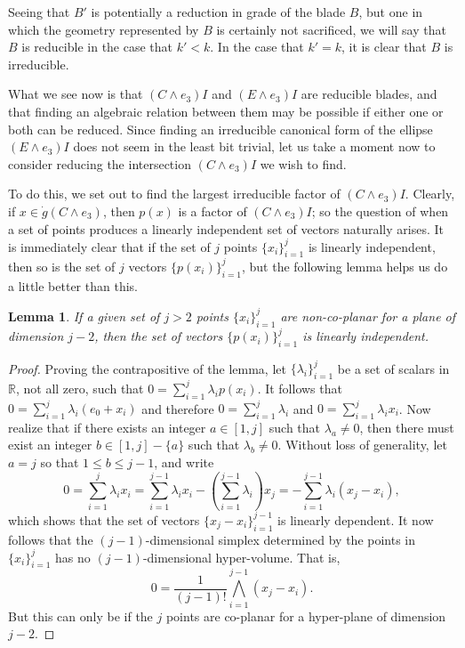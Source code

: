 \documentclass{birkjour}
\newtheorem{lem}[thm]{Lemma}
\theoremstyle{definition}
\theoremstyle{remark}
\numberwithin{equation}{section}
\newcommand{\R}{\mathbb{R}}
\newcommand{\gd}{\dot{g}}
\begin{document}
Seeing that $B'$ is potentially a reduction in grade of the blade $B$, but one
in which the geometry represented by $B$ is certainly not sacrificed,
we will say that $B$ is reducible
in the case that $k'<k$.  In the case that $k'=k$, it is clear that $B$ is irreducible.

What we see now is that $(C\wedge e_3)I$ and $(E\wedge e_3)I$ are reducible blades,
and that finding an algebraic relation between them may be possible if either
one or both can be reduced.  Since finding an irreducible canonical form of the ellipse $(E\wedge e_3)I$
does not seem in the least bit trivial, let us take a moment now to consider reducing the
intersection $(C\wedge e_3)I$ we wish to find.

To do this, we set out to find the largest irreducible factor of $(C\wedge e_3)I$.
Clearly, if $x\in\gd(C\wedge e_3)$, then $p(x)$ is a factor of $(C\wedge e_3)I$; so
the question of when a set of points produces a linearly independent set of
vectors naturally arises.  It is immediately clear that if the set of $j$ points $\{x_i\}_{i=1}^j$
is linearly independent, then so is the set of $j$ vectors $\{p(x_i)\}_{i=1}^j$, but the following
lemma helps us do a little better than this.
\begin{lem}\label{lma_non_co_planar}
If a given set of $j>2$ points $\{x_i\}_{i=1}^j$ are non-co-planar for a plane of
dimension $j-2$, then the set of vectors $\{p(x_i)\}_{i=1}^j$ is linearly independent.
\end{lem}
\begin{proof}
Proving the contrapositive of the lemma, let $\{\lambda_i\}_{i=1}^j$ be
a set of scalars in $\R$, not all zero, such that $0=\sum_{i=1}^j\lambda_i p(x_i)$.
It follows that $0=\sum_{i=1}^j\lambda_i(e_0+x_i)$ and therefore
$0=\sum_{i=1}^j\lambda_i$ and $0=\sum_{i=1}^j\lambda_i x_i$.
Now realize that if there exists an integer $a\in[1,j]$ such that $\lambda_a\neq 0$,
then there must exist an integer $b\in[1,j]-\{a\}$ such that $\lambda_b\neq 0$.
Without loss of generality, let $a=j$ so that $1\leq b\leq j-1$, and write
\begin{equation*}
0 = \sum_{i=1}^j\lambda_ix_i = \sum_{i=1}^{j-1}\lambda_ix_i - \left(\sum_{i=1}^{j-1}\lambda_i\right)x_j = -\sum_{i=1}^{j-1}\lambda_i(x_j-x_i),
\end{equation*}
which shows that the set of vectors $\{x_j-x_i\}_{i=1}^{j-1}$ is linearly dependent.
It now follows that the $(j-1)$-dimensional simplex determined by the points in $\{x_i\}_{i=1}^j$
has no $(j-1)$-dimensional hyper-volume.  That is,
\begin{equation*}
0 = \frac{1}{(j-1)!}\bigwedge_{i=1}^{j-1}(x_j-x_i).
\end{equation*}
But this can only be if the $j$ points are co-planar for a hyper-plane of dimension $j-2$.
\end{proof}
\end{document}
